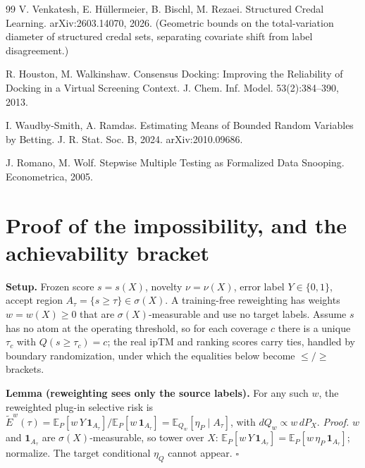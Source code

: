 \documentclass[10pt]{article}
\begin{document}
\begin{thebibliography}{99}
 V. Venkatesh, E. H\"ullermeier, B. Bischl, M. Rezaei. Structured Credal Learning.
arXiv:2603.14070, 2026. (Geometric bounds on the total-variation diameter of structured credal
sets, separating covariate shift from label disagreement.)

 R. Houston, M. Walkinshaw. Consensus Docking: Improving the Reliability
of Docking in a Virtual Screening Context. J. Chem. Inf. Model. 53(2):384--390, 2013.

 I. Waudby-Smith, A. Ramdas. Estimating Means of Bounded Random
Variables by Betting. J. R. Stat. Soc. B, 2024. arXiv:2010.09686.

 J. Romano, M. Wolf. Stepwise Multiple Testing as Formalized Data
Snooping. Econometrica, 2005.
\end{thebibliography}

\appendix
\section{Proof of the impossibility, and the achievability bracket}\label{app:proof}
\small
\textbf{Setup.} Frozen score $s=s(X)$, novelty $\nu=\nu(X)$, error label $Y\in\{0,1\}$, accept
region $A_\tau=\{s\ge\tau\}\in\sigma(X)$. A training-free reweighting has weights $w=w(X)\ge0$ that
are $\sigma(X)$-measurable and use no target labels. Assume $s$ has no atom at the operating
threshold, so for each coverage $c$ there is a unique $\tau_c$ with $Q(s\ge\tau_c)=c$; the real
ipTM and ranking scores carry ties, handled by boundary randomization, under which the equalities
below become $\le/\ge$ brackets.

\textbf{Lemma (reweighting sees only the source labels).} For any such $w$, the reweighted plug-in
selective risk is $\widetilde{E}^w(\tau)=\mathbb{E}_P[w\,Y\,\mathbf{1}_{A_\tau}]/
\mathbb{E}_P[w\,\mathbf{1}_{A_\tau}]=\mathbb{E}_{Q_w}[\eta_P\mid A_\tau]$, with $dQ_w\propto w\,dP_X$.
\emph{Proof.} $w$ and $\mathbf{1}_{A_\tau}$ are $\sigma(X)$-measurable, so tower over $X$:
$\mathbb{E}_P[w\,Y\,\mathbf{1}_{A_\tau}]=\mathbb{E}_P[w\,\eta_P\,\mathbf{1}_{A_\tau}]$; normalize.
The target conditional $\eta_Q$ cannot appear. $\square$
\end{document}
